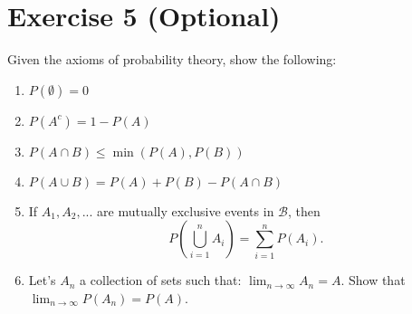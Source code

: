 \documentclass[12pt,thmsa]{article}\usepackage[]{graphicx}\usepackage[]{color}
\begin{document}
\section*{Exercise 5 (Optional)}


Given the axioms of probability theory, show the following:
\begin{enumerate}
  \item $P(\emptyset)=0$
  \item $P(A^c)=1-P(A)$
  \item $P(A \cap B) \leq \min(P(A),P(B))$
  \item $P(A \cup B)=P(A)+P(B)-P(A \cap B)$
  \item If $A_1, A_2,...$ are mutually exclusive events in $\mathcal{B}$, then
\begin{equation}
P\left(  \bigcup_{i=1}^{n} A_i \right) = \sum_{i=1}^{n} P(A_i).  \label{Eq: ProbUnionDisj}
\end{equation}
  \item Let's $A_n$ a collection of sets such that: $\lim_{n\rightarrow \infty}A_n= A$.
  Show that $\lim_{n\rightarrow \infty}P(A_n)=P(A)$.
\end{enumerate}
\end{document}
